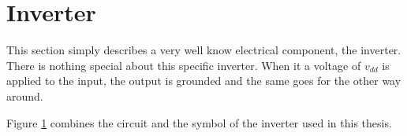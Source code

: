 \section{Inverter}
\label{sec:inv}

This section simply describes a very well know electrical component, the inverter. There is nothing special about this specific inverter. When it a voltage of $v_{dd}$ is applied to the input, the output is grounded and the same goes for the other way around.

\begin{figure}[H]
  \centering
  \hspace*{2.5cm}
  \hfill
  \hspace*{1.5cm}
  \caption{}
  \label{fig:inv}
\end{figure}

Figure \ref{fig:inv} combines the circuit and the symbol of the inverter used in this thesis.
